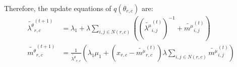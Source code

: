 \documentclass[12pt]{article}
\newenvironment{problem}[2][Problem]{\begin{trivlist}
\item[\hskip \labelsep {\bfseries #1}\hskip \labelsep {\bfseries #2.}]}{\end{trivlist}}
\begin{document}
\begin{problem}{2.9.25}
Therefore, the update equations of $q(\theta_{r,c})$ are:
\begin{align*}
    \tilde{\lambda^{\theta}}_{r,c}^{(t+1)}
    &= \lambda_1 + \lambda\sum_{i,j \in N(r,c)}((\tilde{\lambda^{\mu}}^{(t)}_{i,j})^{-1} + \tilde{m^{\mu}}_{i,j}^{(t)}) \\
    \tilde{m^{\theta}}_{r,c}^{(t+1)}
    &= \frac{1}{\tilde{\lambda^{\theta}}_{r,c}}
    (\lambda_1\mu_1 + (x_{r,c} - \tilde{m^{\mu}}_{r,c}^{(t)})\lambda\sum_{i,j \in N(r,c)}\tilde{m^{\mu}}_{i,j}^{(t)})
\end{align*}
\end{problem} %


\end{document}

